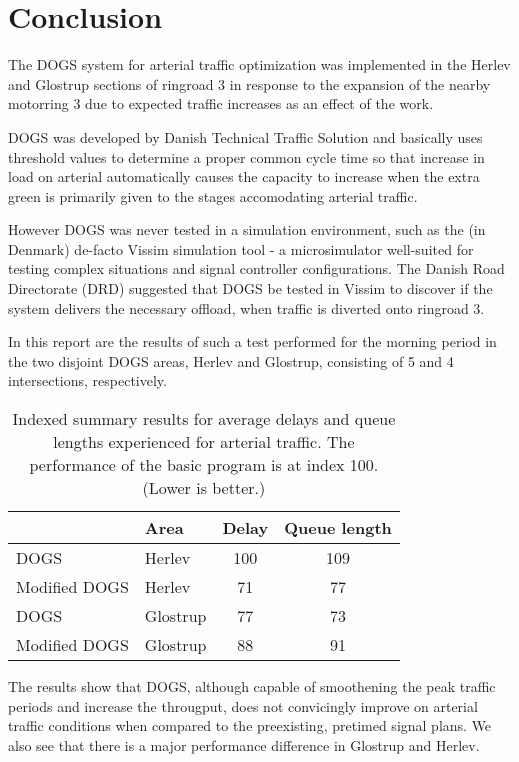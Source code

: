 \section{Conclusion}
\label{conclusion}

The DOGS system for arterial traffic optimization was implemented in the Herlev and Glostrup sections of ringroad 3 in response to the expansion of the nearby motorring 3 due to expected traffic increases as an effect of the work.

DOGS was developed by Danish Technical Traffic Solution and basically uses threshold values to determine a proper common cycle time so that increase in load on arterial automatically causes the capacity to increase when the extra green is primarily given to the stages accomodating arterial traffic.

However DOGS was never tested in a simulation environment, such as the (in Denmark) de-facto Vissim simulation tool - a microsimulator well-suited for testing complex situations and signal controller configurations.
The Danish Road Directorate (DRD) suggested that DOGS be tested in Vissim to discover if the system delivers the necessary offload, when traffic is diverted onto ringroad 3.

In this report are the results of such a test performed for the morning period in the two disjoint DOGS areas, Herlev and Glostrup, consisting of 5 and 4 intersections, respectively. 

\begin{table}[ht]
\centering
\begin{tabular}{l|l|c|c}
& \textbf{Area} & \textbf{Delay} & \textbf{Queue length} \\ \hline
DOGS & Herlev & 100 & 109 \\
Modified DOGS & Herlev & 71 & 77 \\
DOGS & Glostrup & 77 &  73 \\
Modified DOGS & Glostrup & 88 & 91
\end{tabular}
\caption{Indexed summary results for average delays and queue lengths experienced for arterial traffic. The performance of the basic program is at index 100. (Lower is better.)}
\label{tab:result_summary}
\end{table}

The results show that DOGS, although capable of smoothening the peak traffic periods and increase the througput, does not convicingly improve on arterial traffic conditions when compared to the preexisting, pretimed signal plans. We also see that there is a major performance difference in Glostrup and Herlev.

